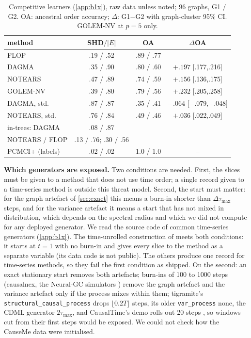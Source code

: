 \documentclass{article}
\theoremstyle{plain}
\theoremstyle{definition}
\theoremstyle{remark}
\begin{document}
\begin{table}[t]
\caption{Competitive learners (\cref{app:b1x}), raw data unless noted; 96
graphs, G1 / G2. OA: ancestral order accuracy; $\Delta$: G1$-$G2 with
graph-cluster 95\% CI. GOLEM-NV at $p=5$ only.}
\label{tab:b1x}
\vskip 0.05in
\centering\scriptsize\setlength{\tabcolsep}{2.5pt}
\begin{tabular}{lccc}
\toprule
method & SHD$/|E|$ & OA & $\Delta$OA \\
\midrule
FLOP & .19 / .52 & .89 / .77 & -- \\
DAGMA & .35 / .90 & .80 / .60 & $+.197$ [.177,.216] \\
NOTEARS & .47 / .89 & .74 / .59 & $+.156$ [.136,.175] \\
GOLEM-NV & .39 / .80 & .79 / .56 & $+.232$ [.205,.258] \\
DAGMA, std. & .87 / .87 & .35 / .41 & $-.064$ [$-$.079,$-$.048] \\
NOTEARS, std. & .76 / .84 & .49 / .46 & $+.036$ [.022,.049] \\
in-trees: DAGMA & .08 / .87 & & \\
\quad NOTEARS / FLOP & .13 / .76; .30 / .56 & & \\
PCMCI+ (labels) & .02 / .02 & 1.0 / 1.0 & -- \\
\bottomrule
\end{tabular}
\vskip -0.1in
\end{table}

\textbf{Which generators are exposed.} Two conditions are needed. First, the
slices must be given to a method that does not use time order; a single
record given to a time-series method is outside this threat model. Second,
the start must matter: for the graph artefact of \cref{sec:exact} this means
a burn-in shorter than $\Delta\tau_{\max}$ steps, and for the variance
artefact it means a start that has not mixed in distribution, which depends on
the spectral radius and which we did not compute for any deployed generator.
We read the source code of common time-series generators (\cref{app:b1x}).
The time-unrolled construction of \citet{reisach2026topological} meets both
conditions: it starts at $t=1$ with no burn-in and gives every slice to the
method as a separate variable (its data code is not public). The others
produce one record for time-series methods, so they fail the first condition
as shipped. On the second: an exact stationary start
\citep{herman2025unitless} removes both artefacts; burn-ins of 100 to 1000
steps (causalnex, the Neural-GC simulators \citep{tank2021neural}) remove the
graph artefact and the variance artefact only if the process mixes within
them; tigramite's \texttt{structural\_causal\_process} \citep{tigramite} drops
$\lfloor0.2T\rfloor$ steps, its older \texttt{var\_process} none, the CDML
generator \citep{lawrence2021dgp} $2\tau_{\max}$, and CausalTime's demo rolls
out 20 steps \citep{cheng2024causaltime}, so windows cut from their first
steps would be exposed. We could not check how the CauseMe data were
initialised.
\end{document}
